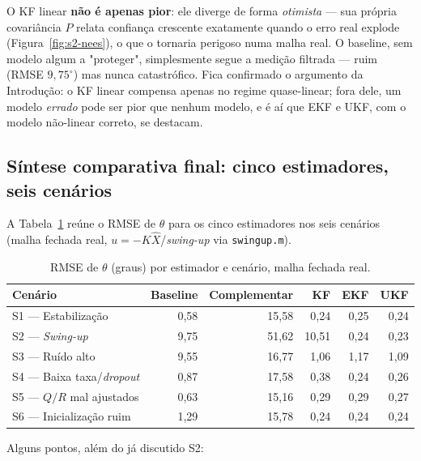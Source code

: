 \documentclass[brazil, 12pt]{article}
\begin{document}
O KF linear \textbf{não é apenas pior}: ele diverge de forma \emph{otimista}
— sua própria covariância $P$ relata confiança crescente exatamente quando o
erro real explode (Figura~\ref{fig:s2-nees}), o que o tornaria perigoso numa
malha real. O baseline, sem modelo algum a "proteger", simplesmente segue a
medição filtrada — ruim (RMSE $9{,}75^{\circ}$) mas nunca catastrófico. Fica
confirmado o argumento da Introdução: o KF linear compensa apenas no regime
quase-linear; fora dele, um modelo \emph{errado} pode ser pior que nenhum
modelo, e é aí que EKF e UKF, com o modelo não-linear correto, se destacam.

\subsection{Síntese comparativa final: cinco estimadores, seis cenários}
\label{sec:sintese-final}

A Tabela~\ref{tab:rmse-final} reúne o RMSE de $\theta$ para os cinco
estimadores nos seis cenários (malha fechada real, $u=-K\hat X$/\emph{swing-up}
via \texttt{swingup.m}).

\begin{table}[H]
\centering
\small
\begin{tabular}{@{}l r r r r r@{}}
\hline
\textbf{Cenário} & \textbf{Baseline} & \textbf{Complementar} & \textbf{KF} & \textbf{EKF} & \textbf{UKF} \\
\hline
S1 — Estabilização        &  0,58 & 15,58 &  0,24 & 0,25 & 0,24 \\
S2 — \emph{Swing-up}      &  9,75 & 51,62 & 10,51 & 0,24 & 0,23 \\
S3 — Ruído alto            &  9,55 & 16,77 &  1,06 & 1,17 & 1,09 \\
S4 — Baixa taxa/\emph{dropout} &  0,87 & 17,58 &  0,38 & 0,24 & 0,26 \\
S5 — $Q/R$ mal ajustados   &  0,63 & 15,16 &  0,29 & 0,29 & 0,27 \\
S6 — Inicialização ruim    &  1,29 & 15,78 &  0,24 & 0,24 & 0,24 \\
\hline
\end{tabular}
\caption{RMSE de $\theta$ (graus) por estimador e cenário, malha fechada real.}
\label{tab:rmse-final}
\end{table}

Alguns pontos, além do já discutido S2:
\end{document}
